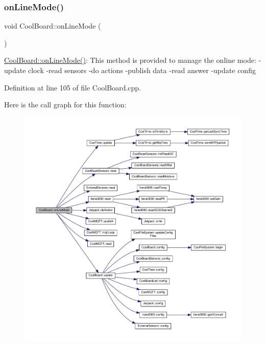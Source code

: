 \subsubsection{\texorpdfstring{on\+Line\+Mode()}{onLineMode()}}
{\footnotesize\ttfamily void Cool\+Board\+::on\+Line\+Mode (\begin{DoxyParamCaption}{ }\end{DoxyParamCaption})}

\hyperlink{class_cool_board_aa0bbc4bc605e35618d18e68795c61363}{Cool\+Board\+::on\+Line\+Mode()}\+: This method is provided to manage the online mode\+: -\/update clock -\/read sensors -\/do actions -\/publish data -\/read answer -\/update config 

Definition at line 105 of file Cool\+Board.\+cpp.

Here is the call graph for this function\+:\nopagebreak
\begin{figure}[H]
\begin{center}
\leavevmode
\includegraphics[width=350pt]{class_cool_board_aa0bbc4bc605e35618d18e68795c61363_cgraph}
\end{center}
\end{figure}
\mbox{\label{class_cool_board_a486507b8f0981d3cc671ed31c2145755}} 
